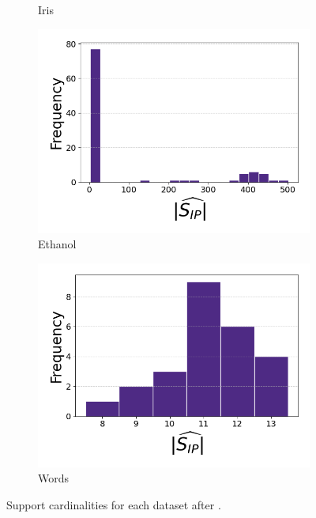 \begin{figure}[t]
\begin{subfigure}[b]{0.45\textwidth}
        \caption{Iris }
        \label{fig:iris_cardinalities}
    \end{subfigure}

    \vspace{0.5em}  %

    \begin{subfigure}[b]{0.45\textwidth}
        \centering
        \includegraphics[width=\textwidth]{../figures/ethanol_cardinalities}
        \caption{Ethanol }
        \label{fig:ethanol_cardinalities}
    \end{subfigure}
    \hfill
    \begin{subfigure}[b]{0.45\textwidth}
        \centering
        \includegraphics[width=\textwidth]{../figures/words_cardinalities}
        \caption{Words }
        \label{fig:words_cardinalities}
    \end{subfigure}

    \caption{Support cardinalities for each dataset after \isometrypursuit.}
    \label{fig:support_cardinalities}
\end{figure}


